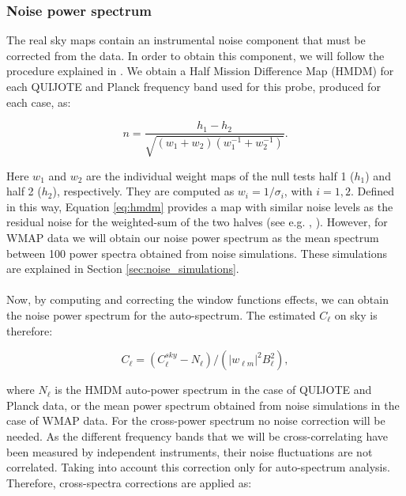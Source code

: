 \subsubsection{Noise power spectrum}

The real sky maps contain an instrumental noise component that must be corrected from the data. In order to obtain this component, we will 
follow the procedure explained in \citealp{QUIJOTE_IV}. We obtain a Half Mission Difference Map (HMDM) for each QUIJOTE and Planck frequency band used for this 
probe, produced for each case, as:

\begin{equation}
    \label{eq:hmdm}
    n = \frac{h_1 - h_2}{\sqrt{ (w_1 + w_2) (w_1^{-1} + w_2^{-1}) }}. 
\end{equation}

Here $w_{1}$ and $w_{2}$ are the individual weight maps of the null tests half 1 ($h_{1}$) and half 2 ($h_{2}$), respectively. They are computed as 
$w_{i} = 1/\sigma_{i}$, with $i = 1, 2$. Defined in this way, Equation \ref{eq:hmdm} provides a map with similar noise levels as the residual 
noise for the weighted-sum of the two halves (see e.g. \citealp{Planck_2014b}, \citealp{Planck_2016f}). However, for WMAP data we will obtain our 
noise power spectrum as the mean spectrum between 100 power spectra obtained from noise simulations. These simulations are explained 
in Section \ref{sec:noise_simulations}.
\paragraph*{}

Now, by computing and correcting the window functions effects, we can obtain the noise power spectrum for the auto-spectrum. The estimated $C_{\ell}$ 
on sky is therefore: 

\begin{equation}
    \label{eq:corrected_cl}
    C_{\ell} = (C_{\ell}^{sky} - N_{\ell}) /( |w_{\ell m}|^2 B_{\ell}^2),
\end{equation}

where $N_{\ell}$ is the HMDM auto-power spectrum in the case of QUIJOTE and Planck data, or the mean power spectrum obtained from noise simulations in the case 
of WMAP data. For the cross-power spectrum no noise correction will be needed. As the different frequency bands that 
we will be cross-correlating have been measured by independent instruments, their noise fluctuations are not correlated. Taking into account this correction only for 
auto-spectrum analysis. Therefore, cross-spectra corrections are applied as:

